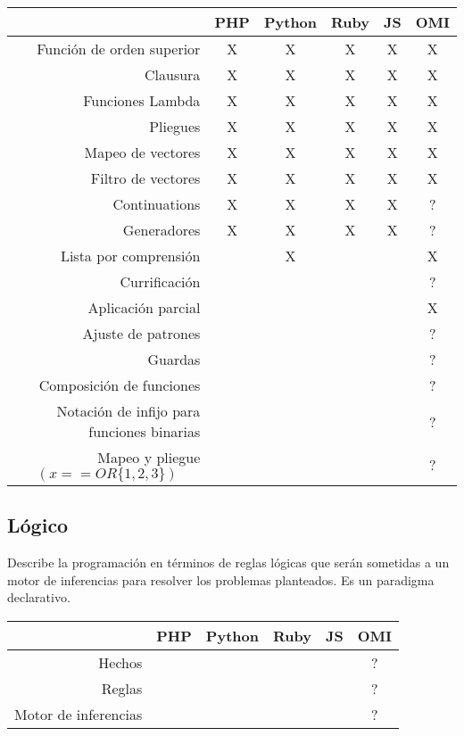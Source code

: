 \FloatBarrier
\begin{table}[h]
\begin{center}
\begin{tabular}{|r|c|c|c|c|c|} \hline
 & PHP  & Python & Ruby & JS & OMI\\ \hline
Función de orden superior & X & X & X & X & X \\ \hline
Clausura  & X & X & X & X & X \\ \hline
Funciones Lambda    & X & X & X & X & X \\ \hline
Pliegues & X & X & X & X & X \\ \hline
Mapeo de vectores & X & X & X & X & X \\ \hline
Filtro de vectores & X & X & X & X & X \\ \hline
Continuations & X & X & X & X & ? \\ \hline
Generadores & X & X & X & X & ? \\ \hline
Lista por comprensión &  & X & &  & X \\ \hline
Currificación  &  &  &  &  & ? \\ \hline
Aplicación parcial & & & & & X \\ \hline
Ajuste de patrones & & & & & ? \\ \hline
Guardas & & & & & ? \\ \hline
Composición de funciones & & & & & ? \\ \hline
Notación de infijo para funciones binarias & & & & & ? \\ \hline
Mapeo y pliegue $$(x ==OR \{1,2,3\})$$ & & & & & ? \\ \hline
\end{tabular}
\end{center}
\end{table}
\FloatBarrier

\subsection{Lógico}
Describe la programación en términos de reglas lógicas  que serán sometidas
a un motor de inferencias para resolver los problemas planteados. 
Es un paradigma declarativo. 

\FloatBarrier
\begin{table}[h]
\begin{center}
 
\begin{tabular}{|r|c|c|c|c|c|} \hline
 & PHP  & Python & Ruby & JS & OMI\\ \hline
Hechos & & & & & ? \\ \hline
Reglas & & & & & ? \\ \hline
Motor de inferencias & & & & & ? \\ \hline
\end{tabular}
\end{center}
\end{table}
\FloatBarrier

